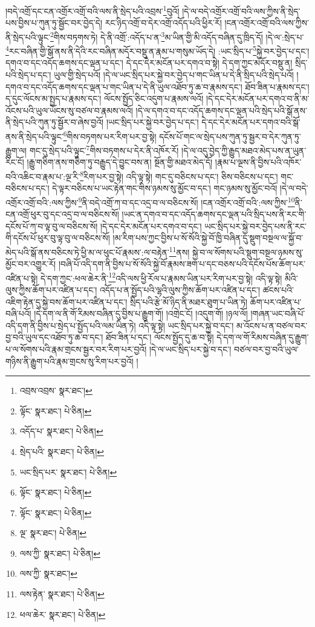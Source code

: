 །བདེ་འགྲོ་དང་ངན་འགྲོར་འགྲོ་བའི་ལས་ནི་སྲེད་པའི་འབྲས་\footnote{འབྲས་འབྲས་  སྣར་ཐང་། }བུའོ། །དེ་ལ་བདེ་འགྲོར་འགྲོ་བའི་ལས་ཀྱིས་ནི་སྲེད་པས་བྱིས་པ་ཀུན་ཏུ་སྦྱོང་བར་བྱེད་དེ། རང་ཉིད་འགྲོ་བ་དེར་འགྲོ་འདོད་པའི་ཕྱིར་རོ། །ངན་འགྲོར་འགྲོ་བའི་ལས་ཀྱིས་ནི་སྲེད་པའི་ལྟུང་\footnote{ལྟོང་  སྣར་ཐང་།  པེ་ཅིན། }གིས་བཏགས་ཏེ། དེ་ནི་འགྲོ་:འདོད་པ་ན་\footnote{འདོད་པ་  སྣར་ཐང་།  པེ་ཅིན། }མ་ཡིན་གྱི་མི་འདོད་བཞིན་དུ་ཁྲིད་དོ། །དེ་ལ་:སྲེད་པ་\footnote{སྲེད་པའི་  སྣར་ཐང་།  པེ་ཅིན། }རང་བཞིན་གྱི་སྒོ་ནས་ནི་དེའི་རང་བཞིན་མདོར་བསྡུ་ན་རྣམ་པ་གསུམ་ཡོད་དེ། :ཡང་སྲིད་པ་\footnote{ཡང་སྲིད་པར་  སྣར་ཐང་།  པེ་ཅིན། }སྐྱེ་བར་བྱེད་པ་དང་། དགའ་བ་དང་འདོད་ཆགས་དང་ལྡན་པ་དང་། དེ་དང་དེར་མངོན་པར་དགའ་བ་སྟེ། དེ་དག་ཀྱང་མདོར་བསྡུ་ན། སྲིད་པའི་སྲེད་པ་དང་། ཡུལ་གྱི་སྲེད་པའོ། །དེ་ལ་ཡང་སྲིད་པར་སྐྱེ་བར་བྱེད་པ་གང་ཡིན་པ་དེ་ནི་སྲིད་པའི་སྲེད་པའོ། །དགའ་བ་དང་འདོད་ཆགས་དང་ལྡན་པ་གང་ཡིན་པ་དེ་ནི་ཡུལ་འཐོབ་ཏུ་ཆ་བ་རྣམས་དང་། ཐོབ་ཟིན་པ་རྣམས་དང་། ད་དུང་ལོངས་མ་སྤྱད་པ་རྣམས་དང་། ལོངས་སྤྱོད་ཅིང་འདུག་པ་རྣམས་ལའོ། །དེ་དང་དེར་མངོན་པར་དགའ་བ་ནི་མ་འོངས་པའི་ཡུལ་ཡོངས་སུ་བཙལ་བ་རྣམས་ལའོ། །དེ་ལ་དགའ་བ་དང་འདོད་ཆགས་དང་ལྡན་པའི་སྲེད་པའི་སྒོ་ནས་ནི་སྲེད་པའི་ཀུན་ཏུ་སྦྱོར་བ་ཞེས་བྱའོ། །ཡང་སྲིད་པར་སྐྱེ་བར་བྱེད་པ་དང་། དེ་དང་དེར་མངོན་པར་དགའ་བའི་སྒོ་ནས་ནི་སྲེད་པའི་ལྟུང་\footnote{ལྟོང་  སྣར་ཐང་།  པེ་ཅིན། }གིས་བཏགས་པར་རིག་པར་བྱ་སྟེ། དངོས་པོ་གང་ལ་སྲེད་པས་ཀུན་ཏུ་སྦྱར་བ་དེར་ཀུན་ཏུ་རྒྱུག་ལ། གང་དུ་སྲེད་པའི་ལྟུང་\footnote{ལྟོང་  སྣར་ཐང་།  པེ་ཅིན། }གིས་བཏགས་པ་དེར་ནི་འཁོར་རོ། །དེ་ལ་འདུ་བྱེད་ཀྱི་རྒྱུད་མཐའ་མེད་པས་ན་ཡུན་རིང་ངོ། །རྒྱུ་གཅིག་ནས་གཅིག་ཏུ་བརྒྱུད་དེ་བྱུང་བས་ན། སྔོན་གྱི་མཐའ་མེད་དོ། །རྣམ་པ་ལྔས་ནི་བྱིས་པའི་འཁོར་བའི་འཆིང་བ་རྣམ་པ་:ལྔ་རི་\footnote{ལྔ་  སྣར་ཐང་།  པེ་ཅིན། }རིག་པར་བྱ་སྟེ། འདི་ལྟ་སྟེ། གང་དུ་བཅིངས་པ་དང་། ཅིས་བཅིངས་པ་དང་། གང་བཅིངས་པ་དང་། དེ་ལྟར་བཅིངས་པ་ཡང་རྟེན་གང་གིས་ཉམས་སུ་མྱོང་བ་དང་། གང་ཉམས་སུ་མྱོང་བའོ། །དེ་ལ་བདེ་འགྲོར་འགྲོ་བའི་:ལས་ཀྱིས་\footnote{ལས་ཀྱི་  སྣར་ཐང་།  པེ་ཅིན། }ནི་བདེ་འགྲོ་ཀ་བ་དང་འདྲ་བ་ལ་བཅིངས་སོ། །ངན་འགྲོར་འགྲོ་བའི་:ལས་ཀྱིས་\footnote{ལས་ཀྱི་  སྣར་ཐང་། }ནི་ངན་འགྲོ་ཕུར་བུ་དང་འདྲ་བ་ལ་བཅིངས་སོ། །ཡང་ན་དགའ་བ་དང་འདོད་ཆགས་དང་ལྡན་པའི་སྲིད་པས་ནི་རང་གི་དངོས་པོ་ཀ་བ་ལྟ་བུ་ལ་བཅིངས་སོ། །དེ་དང་དེར་མངོན་པར་དགའ་བ་དང་། ཡང་སྲིད་པར་སྐྱེ་བར་བྱེད་པས་ནི་རང་གི་དངོས་པོ་ཕུར་བུ་ལྟ་བུ་ལ་བཅིངས་སོ། །མ་རིག་པས་ཀྱང་བྱིས་པ་སོ་སོའི་སྐྱེ་བོ་ཁྱི་བཞིན་དུ་སྡུག་བསྔལ་ལ་སྐྱོ་བ་མེད་པའི་སྒོ་ནས་བཅིངས་ཏེ་ཕྱི་མ་ལ་ཕུང་པོ་རྣམས་:ལ་བརྟེན་\footnote{ལས་རྟེན་  སྣར་ཐང་།  པེ་ཅིན། }ནས། སྐྱེ་བ་ལ་སོགས་པའི་སྡུག་བསྔལ་ཉམས་སུ་མྱོང་བར་འགྱུར་རོ། །བཞི་པོ་འདི་དག་ནི་བྱིས་པ་སོ་སོའི་སྐྱེ་བོ་རྣམས་ཟག་པ་དང་བཅས་པའི་དངོས་པོས་ཆོག་པར་འཛིན་པ་སྟེ། དེ་དག་ཀྱང་:ཕལ་ཆེར་ནི་\footnote{ཕལ་ཆེར་  སྣར་ཐང་།  པེ་ཅིན། }འདི་ལས་ཕྱི་རོལ་པ་རྣམས་ཡིན་པར་རིག་པར་བྱ་སྟེ། འདི་ལྟ་སྟེ། མིའི་ལུས་ཀྱིས་ཆོག་པར་འཛིན་པ་དང་། འདོད་པ་ན་སྤྱོད་པའི་ལྷའི་ལུས་ཀྱིས་ཆོག་པར་འཛིན་པ་དང་། ཚངས་པའི་འཇིག་རྟེན་དུ་སྐྱེ་བས་ཆོག་པར་འཛིན་པ་དང་། སྲིད་པའི་རྩེ་མོ་ཉིད་ནི་མཐར་ཐུག་པ་ཡིན་ཏེ། ཆོག་པར་འཛིན་པ་བཞི་པའོ། །དེ་དག་ལ་ནི་གོ་རིམས་བཞིན་དུ་བྱིས་པ་རྒྱུག་གོ། །འགྲེང་ངོ། །འདུག་གོ། །ཉལ་ལོ། །གཞན་ཡང་བཞི་པོ་འདི་དག་ནི་བྱིས་པ་སྲེད་པ་སྤྱོད་པའི་ལམ་ཡིན་ཏེ། འདི་ལྟ་སྟེ། ཡང་སྲིད་པར་སྐྱེ་བ་དང་། མ་འོངས་པ་ན་བཙལ་བར་བྱ་བའི་ཡུལ་དང་འཐོབ་ཏུ་ཆ་བ་དང་། ཐོབ་ཟིན་པ་དང་། ལོངས་སྤྱོད་དུ་ཆ་བ་སྟེ། དེ་དག་ལ་གོ་རིམས་བཞིན་དུ་རྒྱུག་པ་ལ་སོགས་པའི་རྣམ་གྲངས་སྦྱར་བར་རིག་པར་བྱའོ། །དེ་ལ་ཡང་སྲིད་པར་སྐྱེ་བ་དང་། བཙལ་བར་བྱ་བའི་ཡུལ་གཉིས་ནི་རྒྱུག་པའི་རྣམ་གྲངས་སུ་རིག་པར་བྱའོ། །
